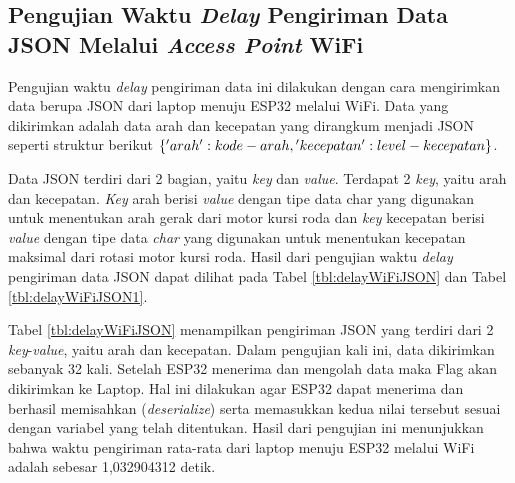 \newpage

\subsection{Pengujian Waktu \emph{Delay} Pengiriman Data JSON Melalui \emph{Access Point} WiFi}
\label{sec:delayWiFiJSON}

Pengujian waktu \emph{delay} pengiriman data ini dilakukan dengan cara mengirimkan data berupa JSON dari laptop menuju ESP32 melalui WiFi. Data yang dikirimkan adalah data arah dan kecepatan yang dirangkum menjadi JSON seperti struktur berikut \(\{'arah': kode-arah, \\'kecepatan': level-kecepatan\}\). 

Data JSON terdiri dari 2 bagian, yaitu \emph{key} dan \emph{value}. Terdapat 2 \emph{key}, yaitu arah dan kecepatan. \emph{Key} arah berisi \emph{value} dengan tipe data char yang digunakan untuk menentukan arah gerak dari motor kursi roda dan \emph{key} kecepatan berisi \emph{value} dengan tipe data \emph{char} yang digunakan untuk menentukan kecepatan maksimal dari rotasi motor kursi roda. Hasil dari pengujian waktu \emph{delay} pengiriman data JSON dapat dilihat pada Tabel \ref{tbl:delayWiFiJSON} dan Tabel \ref{tbl:delayWiFiJSON1}.

Tabel \ref{tbl:delayWiFiJSON} menampilkan pengiriman JSON yang terdiri dari 2 \emph{key}-\emph{value}, yaitu arah dan kecepatan. Dalam pengujian kali ini, data dikirimkan sebanyak 32 kali. Setelah ESP32 menerima dan mengolah data maka Flag akan dikirimkan ke Laptop. Hal ini dilakukan agar ESP32 dapat menerima dan berhasil memisahkan (\emph{deserialize}) serta memasukkan kedua nilai tersebut sesuai dengan variabel yang telah ditentukan. Hasil dari pengujian ini menunjukkan bahwa waktu pengiriman rata-rata dari laptop menuju ESP32 melalui WiFi adalah sebesar 1,032904312 detik.

